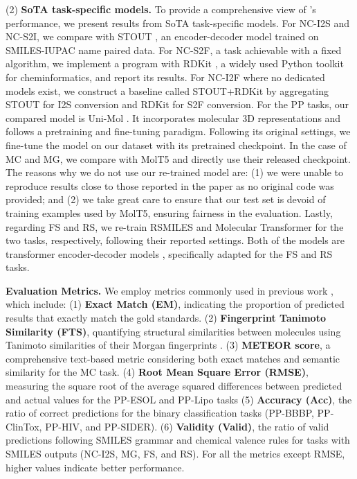 (2) \textbf{SoTA task-specific models.} To provide a comprehensive view of \modelname's performance, we present results from SoTA task-specific models. 
For NC-I2S and NC-S2I, we compare with STOUT \citep{rajan2021stout}, an encoder-decoder model trained on SMILES-IUPAC name paired data. 
For NC-S2F, a task achievable with a fixed algorithm, we implement a program with RDKit \citep{rdkit}, a widely used Python toolkit for cheminformatics, and report its results. 
For NC-I2F where no dedicated models exist, we construct a baseline called STOUT+RDKit by aggregating STOUT for I2S conversion and RDKit for S2F conversion. 
For the PP tasks, our compared model is Uni-Mol \citep{zhou2023unimol}. It incorporates molecular 3D representations and follows a pretraining and fine-tuning paradigm. Following its original settings, we fine-tune the model on our \datasetname dataset with its pretrained checkpoint. 
In the case of MC and MG, we compare with MolT5 \citep{edwards2022translation} and directly use their released checkpoint. The reasons why we do not use our re-trained model are: (1) we were unable to reproduce results close to those reported in the paper as no original code was provided; and (2) we take great care to ensure that our test set is devoid of training examples used by MolT5, ensuring fairness in the evaluation.
Lastly, regarding FS and RS, we re-train RSMILES \citep{Zhong2022} and Molecular Transformer \citep{schwaller2019molecular} for the two tasks, respectively, following their reported settings. Both of the models are transformer encoder-decoder models \citep{vaswani2017attention}, specifically adapted for the FS and RS tasks.

\noindent \textbf{Evaluation Metrics.}
We employ metrics commonly used in previous work \citep{schwaller2019molecular,Zhong2022,fang2023mol,zhou2023unimol,chen2023g2retro}, which include: 
(1) \textbf{Exact Match (EM)}, indicating the proportion of predicted results that exactly match the gold standards. 
(2) \textbf{Fingerprint Tanimoto Similarity (FTS)}, quantifying structural similarities between molecules using Tanimoto similarities of their Morgan fingerprints \citep{Morgan1965}.
(3) \textbf{METEOR score}, a comprehensive text-based metric considering both exact matches and semantic similarity \citep{lavie-agarwal-2007-meteor} for the MC task.
(4) \textbf{Root Mean Square Error (RMSE)}, measuring the square root of the average squared differences between predicted and actual values for the PP-ESOL and PP-Lipo tasks 
(5) \textbf{Accuracy (Acc)}, the ratio of correct predictions for the binary classification tasks (PP-BBBP, PP-ClinTox, PP-HIV, and PP-SIDER). 
(6) \textbf{Validity (Valid)}, the ratio of valid predictions following SMILES grammar and chemical valence rules for tasks with SMILES outputs (NC-I2S, MG, FS, and RS). 
For all the metrics except RMSE, higher values indicate better performance.

